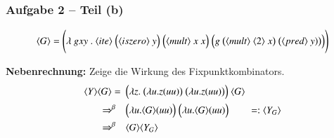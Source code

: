 \documentclass[aspectratio=1610,onlymath, ngerman]{beamer}
\renewcommand{\emph}[1]{\textbf{#1}}
\newcommand{\num}[1]{\ensuremath{\langle #1 \rangle}}
\begin{document}
	\begin{frame} \frametitle{Aufgabe 2 -- Teil (b)}
	\small
		\begin{equation*}
		\num{G} = \Biggl( \lambda \ g xy \ . \ \num{ite} \ \Bigl(\num{iszero} \ y \Bigr) \ \Bigl( \num{mult} \ x \ x \Bigr) \ \Bigl( g \ \bigl( \num{mult} \ \num{2} \ x \bigr) \ \bigl(\num{pred} \ y) \bigr) \Bigr) \Biggr)
		\end{equation*}
		
		\bigskip 
		\pause
		
		\emph{Nebenrechnung:} Zeige die Wirkung des Fixpunktkombinators.
		\pause
		\begin{align*}
		\num{Y} \num{G}
		= \enskip &\Bigl( \lambda z . \ \bigl( \lambda u . z (uu) \bigr) \ \bigl( \lambda u. z (uu) \bigr) \Bigr) \ \num{G} \\
		\Rightarrow^{\beta} \quad &\Bigl( \lambda u . \num{G} (uu) \Bigr) \ \Bigl( \lambda u. \num{G} (uu) \Bigr) \qquad =: \num{Y_G} \\
		\Rightarrow^{\beta} \quad &\num{G} \num{Y_G}
		\end{align*}
	\end{frame}
\end{document}
